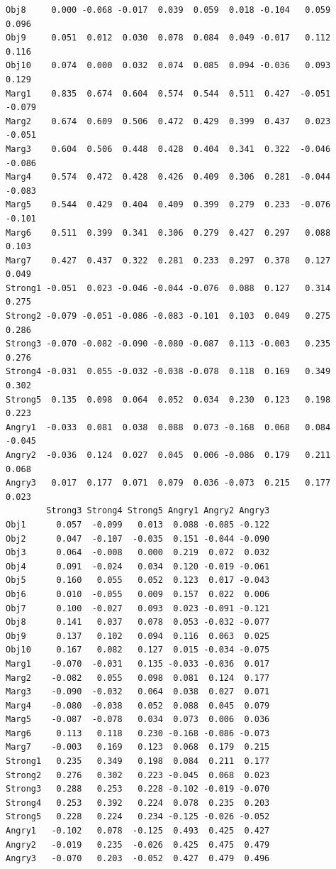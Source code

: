 \documentclass[
  english,
]{book}
\begin{document}
\begin{verbatim}
Obj8     0.000 -0.068 -0.017  0.039  0.059  0.018 -0.104   0.059   0.096
Obj9     0.051  0.012  0.030  0.078  0.084  0.049 -0.017   0.112   0.116
Obj10    0.074  0.000  0.032  0.074  0.085  0.094 -0.036   0.093   0.129
Marg1    0.835  0.674  0.604  0.574  0.544  0.511  0.427  -0.051  -0.079
Marg2    0.674  0.609  0.506  0.472  0.429  0.399  0.437   0.023  -0.051
Marg3    0.604  0.506  0.448  0.428  0.404  0.341  0.322  -0.046  -0.086
Marg4    0.574  0.472  0.428  0.426  0.409  0.306  0.281  -0.044  -0.083
Marg5    0.544  0.429  0.404  0.409  0.399  0.279  0.233  -0.076  -0.101
Marg6    0.511  0.399  0.341  0.306  0.279  0.427  0.297   0.088   0.103
Marg7    0.427  0.437  0.322  0.281  0.233  0.297  0.378   0.127   0.049
Strong1 -0.051  0.023 -0.046 -0.044 -0.076  0.088  0.127   0.314   0.275
Strong2 -0.079 -0.051 -0.086 -0.083 -0.101  0.103  0.049   0.275   0.286
Strong3 -0.070 -0.082 -0.090 -0.080 -0.087  0.113 -0.003   0.235   0.276
Strong4 -0.031  0.055 -0.032 -0.038 -0.078  0.118  0.169   0.349   0.302
Strong5  0.135  0.098  0.064  0.052  0.034  0.230  0.123   0.198   0.223
Angry1  -0.033  0.081  0.038  0.088  0.073 -0.168  0.068   0.084  -0.045
Angry2  -0.036  0.124  0.027  0.045  0.006 -0.086  0.179   0.211   0.068
Angry3   0.017  0.177  0.071  0.079  0.036 -0.073  0.215   0.177   0.023
        Strong3 Strong4 Strong5 Angry1 Angry2 Angry3
Obj1      0.057  -0.099   0.013  0.088 -0.085 -0.122
Obj2      0.047  -0.107  -0.035  0.151 -0.044 -0.090
Obj3      0.064  -0.008   0.000  0.219  0.072  0.032
Obj4      0.091  -0.024   0.034  0.120 -0.019 -0.061
Obj5      0.160   0.055   0.052  0.123  0.017 -0.043
Obj6      0.010  -0.055   0.009  0.157  0.022  0.006
Obj7      0.100  -0.027   0.093  0.023 -0.091 -0.121
Obj8      0.141   0.037   0.078  0.053 -0.032 -0.077
Obj9      0.137   0.102   0.094  0.116  0.063  0.025
Obj10     0.167   0.082   0.127  0.015 -0.034 -0.075
Marg1    -0.070  -0.031   0.135 -0.033 -0.036  0.017
Marg2    -0.082   0.055   0.098  0.081  0.124  0.177
Marg3    -0.090  -0.032   0.064  0.038  0.027  0.071
Marg4    -0.080  -0.038   0.052  0.088  0.045  0.079
Marg5    -0.087  -0.078   0.034  0.073  0.006  0.036
Marg6     0.113   0.118   0.230 -0.168 -0.086 -0.073
Marg7    -0.003   0.169   0.123  0.068  0.179  0.215
Strong1   0.235   0.349   0.198  0.084  0.211  0.177
Strong2   0.276   0.302   0.223 -0.045  0.068  0.023
Strong3   0.288   0.253   0.228 -0.102 -0.019 -0.070
Strong4   0.253   0.392   0.224  0.078  0.235  0.203
Strong5   0.228   0.224   0.234 -0.125 -0.026 -0.052
Angry1   -0.102   0.078  -0.125  0.493  0.425  0.427
Angry2   -0.019   0.235  -0.026  0.425  0.475  0.479
Angry3   -0.070   0.203  -0.052  0.427  0.479  0.496
\end{verbatim}
\end{document}
